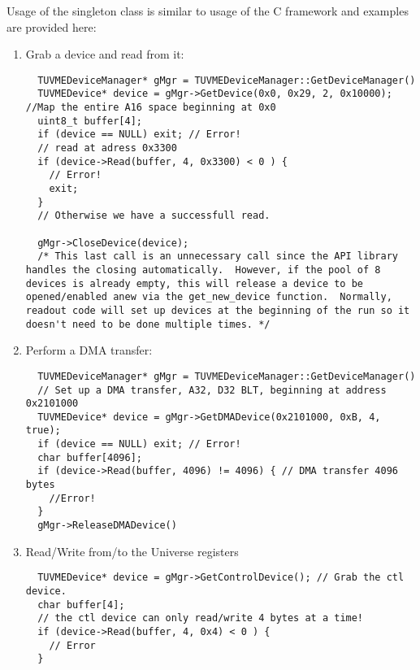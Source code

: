 Usage of the singleton class is
similar to usage of the C framework and examples are provided here: 
			\begin{enumerate}
			\item Grab a device and read from it:
				\begin{lstlisting}
  TUVMEDeviceManager* gMgr = TUVMEDeviceManager::GetDeviceManager()
  TUVMEDevice* device = gMgr->GetDevice(0x0, 0x29, 2, 0x10000); //Map the entire A16 space beginning at 0x0
  uint8_t buffer[4];
  if (device == NULL) exit; // Error!
  // read at adress 0x3300 
  if (device->Read(buffer, 4, 0x3300) < 0 ) { 
    // Error!
    exit;
  }
  // Otherwise we have a successfull read.

  gMgr->CloseDevice(device);  
  /* This last call is an unnecessary call since the API library handles the closing automatically.  However, if the pool of 8 devices is already empty, this will release a device to be opened/enabled anew via the get_new_device function.  Normally, readout code will set up devices at the beginning of the run so it doesn't need to be done multiple times. */

				\end{lstlisting}
			\item Perform a DMA transfer:
				\begin{lstlisting}
  TUVMEDeviceManager* gMgr = TUVMEDeviceManager::GetDeviceManager()
  // Set up a DMA transfer, A32, D32 BLT, beginning at address 0x2101000
  TUVMEDevice* device = gMgr->GetDMADevice(0x2101000, 0xB, 4, true); 
  if (device == NULL) exit; // Error!
  char buffer[4096]; 
  if (device->Read(buffer, 4096) != 4096) { // DMA transfer 4096 bytes
    //Error!
  }
  gMgr->ReleaseDMADevice()
				\end{lstlisting}
  			\item Read/Write from/to the Universe registers

				\begin{lstlisting}
  TUVMEDevice* device = gMgr->GetControlDevice(); // Grab the ctl device. 
  char buffer[4];
  // the ctl device can only read/write 4 bytes at a time!
  if (device->Read(buffer, 4, 0x4) < 0 ) { 
    // Error
  } 
				\end{lstlisting}

			\end{enumerate}




